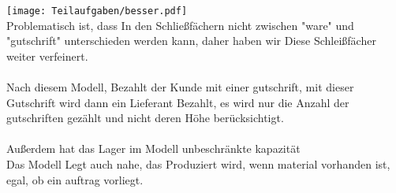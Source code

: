 \documentclass[12pt,a4paper]{article}
\begin{document}
\texttt{[image: Teilaufgaben/besser.pdf]}\\
Problematisch ist, dass In den Schließfächern nicht zwischen "{}ware"{} und "{}gutschrift"{} unterschieden werden kann, daher haben wir Diese Schleißfächer weiter verfeinert.\\
\\
Nach diesem Modell, Bezahlt der Kunde mit einer gutschrift, mit dieser Gutschrift wird dann ein Lieferant Bezahlt, es wird nur die Anzahl der gutschriften gezählt und nicht deren Höhe berücksichtigt.\\
\\
Außerdem hat das Lager im Modell unbeschränkte kapazität\\
Das Modell Legt auch nahe, das Produziert wird, wenn material vorhanden ist, egal, ob ein auftrag vorliegt.


%

%
%
%
%
%
\end{document}
